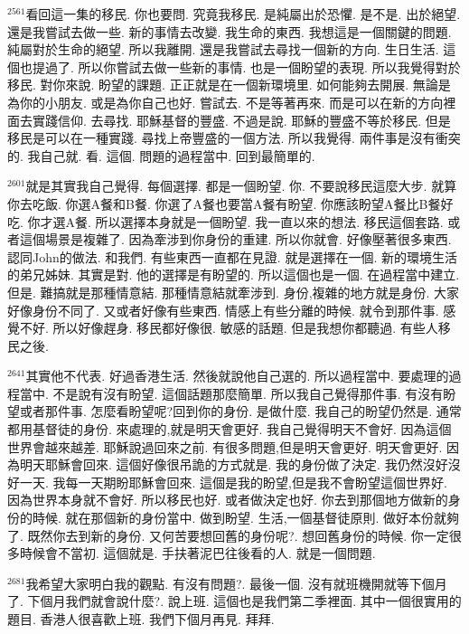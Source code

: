 \documentclass{book}
\begin{document}
$^{2561}$看回這一集的移民.
你也要問.
究竟我移民.
是純屬出於恐懼.
是不是.
出於絕望.
還是我嘗試去做一些.
新的事情去改變.
我生命的東西.
我想這是一個關鍵的問題.
純屬對於生命的絕望.
所以我離開.
還是我嘗試去尋找一個新的方向.
生日生活.
這個也提過了.
所以你嘗試去做一些新的事情.
也是一個盼望的表現.
所以我覺得對於移民.
對你來說.
盼望的課題.
正正就是在一個新環境里.
如何能夠去開展.
無論是為你的小朋友.
或是為你自己也好.
嘗試去.
不是等著再來.
而是可以在新的方向裡面去實踐信仰.
去尋找.
耶穌基督的豐盛.
不過是說.
耶穌的豐盛不等於移民.
但是移民是可以在一種實踐.
尋找上帝豐盛的一個方法.
所以我覺得.
兩件事是沒有衝突的.
我自己就.
看.
這個.
問題的過程當中.
回到最簡單的.

$^{2601}$就是其實我自己覺得.
每個選擇.
都是一個盼望.
你.
不要說移民這麼大步.
就算你去吃飯.
你選A餐和B餐.
你選了A餐也要當A餐有盼望.
你應該盼望A餐比B餐好吃.
你才選A餐.
所以選擇本身就是一個盼望.
我一直以來的想法.
移民這個套路.
或者這個場景是複雜了.
因為牽涉到你身份的重建.
所以你就會.
好像壓著很多東西.
認同John的做法.
和我們.
有些東西一直都在見證.
就是選擇在一個.
新的環境生活的弟兄姊妹.
其實是對.
他的選擇是有盼望的.
所以這個也是一個.
在過程當中建立.
但是.
難搞就是那種情意結.
那種情意結就牽涉到.
身份,複雜的地方就是身份.
大家好像身份不同了.
又或者好像有些東西.
情感上有些分離的時候.
就令到那件事.
感覺不好.
所以好像趕身.
移民都好像很.
敏感的話題.
但是我想你都聽過.
有些人移民之後.

$^{2641}$其實他不代表.
好過香港生活.
然後就說他自己選的.
所以過程當中.
要處理的過程當中.
不是說有沒有盼望.
這個話題那麼簡單.
所以我自己覺得那件事.
有沒有盼望或者那件事.
怎麼看盼望呢?回到你的身份.
是做什麼.
我自己的盼望仍然是.
通常都用基督徒的身份.
來處理的,就是明天會更好.
我自己覺得明天不會好.
因為這個世界會越來越差.
耶穌說過回來之前.
有很多問題,但是明天會更好.
明天會更好.
因為明天耶穌會回來.
這個好像很吊詭的方式就是.
我的身份做了決定.
我仍然沒好沒好一天.
我每一天期盼耶穌會回來.
這個是我的盼望,但是我不會盼望這個世界好.
因為世界本身就不會好.
所以移民也好.
或者做決定也好.
你去到那個地方做新的身份的時候.
就在那個新的身份當中.
做到盼望.
生活,一個基督徒原則.
做好本份就夠了.
既然你去到新的身份.
又何苦要想回舊的身份呢?.
想回舊身份的時候.
你一定很多時候會不當初.
這個就是.
手扶著泥巴往後看的人.
就是一個問題.

$^{2681}$我希望大家明白我的觀點.
有沒有問題?.
最後一個.
沒有就班機開就等下個月了.
下個月我們就會說什麼?.
說上班.
這個也是我們第二季裡面.
其中一個很實用的題目.
香港人很喜歡上班.
我們下個月再見.
拜拜.
\newpage
\end{document}
